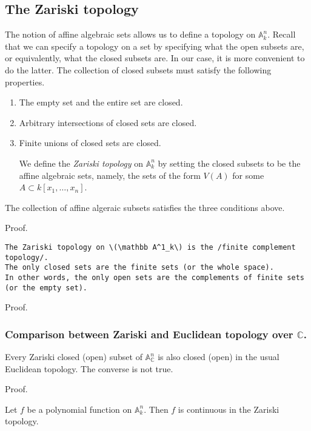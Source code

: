 \documentclass[11pt]{article}
\begin{document}
\subsection{The Zariski topology}
\label{sec:orgb987dfa}
The notion of affine algebraic sets allows us to define a topology on \(\mathbb A^n_k\).
Recall that we can specify a topology on a set by specifying what the open subsets are, or equivalently, what the closed subsets are.
In our case, it is more convenient to do the latter.
The collection of closed subsets must satisfy the following properties.
\begin{enumerate}
\item The empty set and the entire set are closed.
\item Arbitrary intersections of closed sets are closed.
\item Finite unions of closed sets are closed.

We define the \emph{Zariski topology} on \(\mathbb A^n_k\) by setting the closed subsets to be the affine algebraic sets, namely, the sets of the form \(V(A)\) for some \(A \subset k[x_1,\dots,x_n]\).
\end{enumerate}
\begin{proposition}
The collection of affine algeraic subsets satisfies the three conditions above.
\end{proposition}
\begin{skipped}
Proof.
\end{skipped}
\begin{verbatim}
The Zariski topology on \(\mathbb A^1_k\) is the /finite complement topology/.
The only closed sets are the finite sets (or the whole space).
In other words, the only open sets are the complements of finite sets (or the empty set).
\end{verbatim}
\begin{skipped}
Proof.
\end{skipped}

\subsubsection{Comparison between Zariski and Euclidean topology over \(\mathbb C\).}
\label{sec:org1125ac0}
Every Zariski closed (open) subset of \(\mathbb A^n_{\mathbb C}\) is also closed (open) in the usual Euclidean topology.
The converse is not true.
\begin{skipped}
Proof.
\end{skipped}

\begin{proposition}
Let \(f\) be a polynomial function on \(\mathbb A^n_k\).
Then \(f\) is continuous in the Zariski topology.
\end{proposition}
\end{document}
